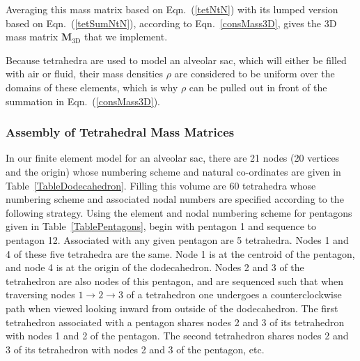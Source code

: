 Averaging this mass matrix based on Eqn.~(\ref{tetNtN}) with its lumped version based on Eqn.~(\ref{tetSumNtN}), according to Eqn.~\eqref{consMass3D}, gives the 3D mass matrix $\mathbf{M}_{\textrm{3D}}$ that we implement.

Because tetrahedra are used to model an alveolar sac, which will either be filled with air or fluid, their mass densities $\rho$ are considered to be uniform over the domains of these elements, which is why $\rho$ can be pulled out in front of the summation in Eqn.~(\ref{consMass3D}).

\subsubsection{Assembly of Tetrahedral Mass Matrices}

In our finite element model for an alveolar sac, there are 21 nodes (20 vertices and the origin) whose numbering scheme and natural co-ordinates are given in Table~\ref{TableDodecahedron}.  Filling this volume are 60 tetrahedra whose numbering scheme and associated nodal numbers are specified according to the following strategy.  Using the element and nodal numbering scheme for pentagons given in Table~\ref{TablePentagons}, begin with pentagon 1 and sequence to pentagon 12.  Associated with any given pentagon are 5 tetrahedra.  Nodes 1 and 4 of these five tetrahedra are the same.  Node 1 is at the centroid of the pentagon, and node 4 is at the origin of the dodecahedron.  Nodes 2 and 3 of the tetrahedron are also nodes of this pentagon, and are sequenced such that when traversing nodes $1 \to 2 \to 3$ of a tetrahedron one undergoes a counter\-clockwise path when viewed looking inward from outside of the dodecahedron.  The first tetrahedron associated with a pentagon shares nodes 2 and 3 of its tetrahedron with nodes 1 and 2 of the pentagon.  The second tetrahedron shares nodes 2 and 3 of its tetrahedron with nodes 2 and 3 of the pentagon, etc.

